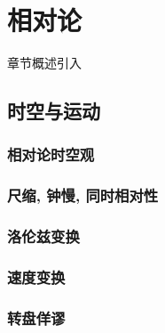 \chapter{相对论}\label{28}

章节概述引入

\section{时空与运动}\label{28-1}

\subsection{相对论时空观}\label{28-1-1}

\subsection{尺缩, 钟慢, 同时相对性}\label{28-1-2}

\subsection{洛伦兹变换}\label{28-1-3}

\subsection{速度变换}\label{28-1-4}

\subsection{转盘佯谬}\label{28-1-5}